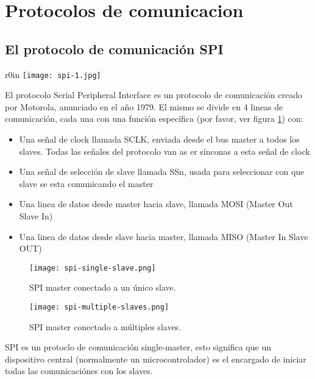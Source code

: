 \documentclass[../informe_krapp.tex]{subfiles}
\begin{document}
\section{Protocolos de comunicacion}

\subsection{El protocolo de comunicación SPI}
\begin{wrapfigure}{r}{0in}
	\centering
	\texttt{[image: spi-1.jpg]}
\end{wrapfigure}

El protocolo Serial Peripheral Interface es un protocolo de comunicación creado por
Motorola, anunciado en el año 1979.
El mismo se divide en 4 lineas de comunicación, cada una con una función específica
(por favor, ver figura \ref{spi-single-slave}) con:

\begin{itemize}
	\item Una señal de clock llamada SCLK, enviada desde el bus master a todos los slaves.
	      Todas las señales del protocolo van as er sínconas a esta señal de clock
	\item Una señal de selección de slave llamada SSn, usada para seleccionar con
	      que slave se esta comunicando el master
	\item Una linea de datos desde master hacia slave, llamada MOSI (Master Out Slave In)
	\item Una linea de datos desde slave hacia master, llamada MISO (Master In Slave OUT)
\end{itemize}

\begin{figure}[H]
	\centering
	\texttt{[image: spi-single-slave.png]}
	\caption{SPI master conectado a un único slave.}
	\label{spi-single-slave}
\end{figure}

\begin{figure}[H]
	\centering
	\texttt{[image: spi-multiple-slaves.png]}
	\caption{SPI master conectado a múltiples slaves.}
	\label{spi-multiple-slaves}
\end{figure}

\clearpage

SPI es un protoclo de comunicación single-master, esto significa que un dispositivo
central (normalmente un microcontrolador) es el encargado de iniciar todas
las comunicaciónes con los slaves.
\end{document}
